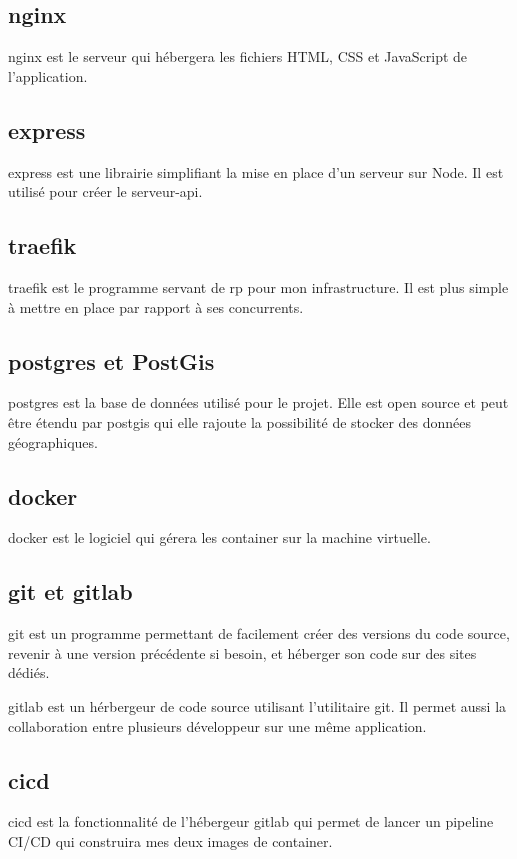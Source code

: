 \documentclass[
    iai, %
    il, %
]{heig-tb}
\begin{document}
\subsection{\gls{nginx}}
\gls{nginx} est le serveur qui hébergera les fichiers HTML, CSS et JavaScript de l'application.

\subsection{\gls{express}}
\gls{express} est une librairie simplifiant la mise en place d'un serveur sur Node.
Il est utilisé pour créer le serveur-api.

\subsection{\gls{traefik}}
\gls{traefik} est le programme servant de \gls{rp} pour mon infrastructure.
Il est plus simple à mettre en place par rapport à ses concurrents.

\subsection{\gls{postgres} et PostGis}
\gls{postgres} est la base de données utilisé pour le projet.
Elle est open source et peut être étendu par \gls{postgis} qui elle rajoute la possibilité de stocker des données géographiques.

\subsection{\gls{docker}}
\gls{docker} est le logiciel qui gérera les container sur la machine virtuelle.


\subsection{\gls{git} et \gls{gitlab}}
\gls{git} est un programme permettant de facilement créer des versions du code source, revenir à une version précédente si besoin, et héberger son code sur des sites dédiés.

\gls{gitlab} est un hérbergeur de code source utilisant l'utilitaire \gls{git}.
Il permet aussi la collaboration entre plusieurs développeur sur une même application.

\subsection{\gls{cicd}}
\gls{cicd} est la fonctionnalité de l'hébergeur \gls{gitlab}
qui permet de lancer un pipeline CI/CD qui construira mes deux images de container.
\end{document}
